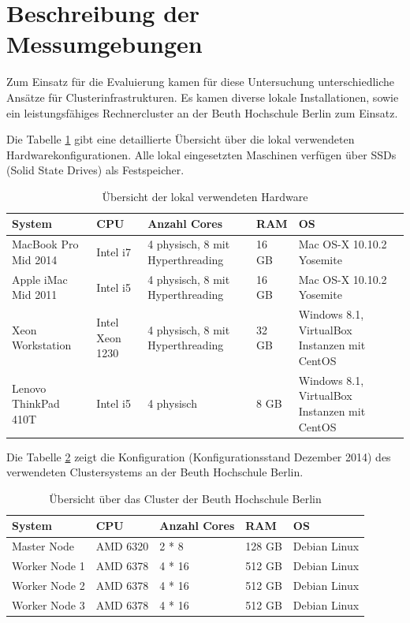 \section{Beschreibung der Messumgebungen}
\label{section:messumgebungen}

Zum Einsatz für die Evaluierung kamen für diese Untersuchung unterschiedliche Ansätze für Clusterinfrastrukturen. Es kamen diverse lokale Installationen, sowie ein leistungsfähiges Rechnercluster an der Beuth Hochschule Berlin zum Einsatz.  

Die Tabelle \ref{tab:lokale hardware} gibt eine detaillierte Übersicht über die lokal verwendeten Hardwarekonfigurationen. Alle lokal eingesetzten Maschinen verfügen über SSDs (Solid State Drives) als Festspeicher.

\begin{table}[!ht]
\centering
\begin{tabular}{| p{3cm} | p{2.2cm} |  p{3cm} |  p{1.2cm} | p{3cm} | }
\hline
System & CPU & Anzahl Cores & RAM & OS\\ \hline \hline
MacBook Pro Mid 2014 & Intel i7 & 4 physisch, 8 mit Hyperthreading & 16 GB & Mac OS-X 10.10.2 Yosemite \\ \hline
Apple iMac Mid 2011 & Intel i5 & 4 physisch, 8 mit Hyperthreading & 16 GB & Mac OS-X 10.10.2 Yosemite \\ \hline
Xeon Workstation & Intel Xeon 1230 & 4 physisch, 8 mit Hyperthreading & 32 GB & Windows 8.1,  VirtualBox Instanzen mit CentOS  \\ \hline 
Lenovo ThinkPad 410T & Intel i5 & 4 physisch & 8 GB & Windows 8.1, VirtualBox Instanzen mit CentOS  \\ \hline 

\end{tabular}
\caption{Übersicht der lokal verwendeten Hardware}
	\label{tab:lokale hardware}
\end{table}  

Die Tabelle \ref{tab:cluster} zeigt die Konfiguration (Konfigurationsstand Dezember 2014) des verwendeten Clustersystems an der Beuth Hochschule Berlin. 

\begin{table}[!ht]
\centering
\begin{tabular}{| p{3cm} | p{2.2cm} |  p{3cm} |  p{1.2cm} | p{3cm} | }
\hline
System & CPU & Anzahl Cores & RAM & OS\\ \hline \hline
Master Node & AMD 6320 & 2 * 8  & 128 GB & Debian Linux \\ \hline
Worker Node 1 & AMD 6378 & 4 * 16 & 512 GB &  Debian Linux\\ \hline
Worker Node 2 & AMD 6378 & 4 * 16 & 512 GB &  Debian Linux\\ \hline
Worker Node 3 & AMD 6378 & 4 * 16 & 512 GB &  Debian Linux\\ \hline

\end{tabular}
\caption{Übersicht über das Cluster der Beuth Hochschule Berlin}
	\label{tab:cluster}
\end{table}  


